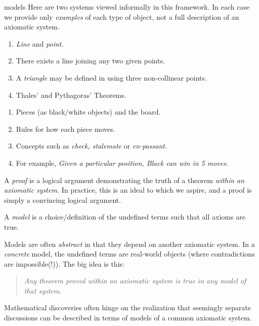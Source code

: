 \begin{examples}{}{models}
Here are two systems viewed informally in this framework. In each case we provide only \emph{examples} of each type of object, not a full description of an axiomatic system.\vspace{-5pt}
\begin{description}\itemsep0pt
	\item[\normalfont\emph{Basic Geometry}]\begin{enumerate}\itemsep2pt
	  \item \emph{Line} and \emph{point.}
	  \item There exists a line joining any two given points.
	  \item A \emph{triangle} may be defined in using three non-collinear points. 
	  \item Thales' and Pythagoras' Theorems.
  \end{enumerate}
	\item[\normalfont\emph{Chess}]\begin{enumerate}\itemsep2pt
	  \item Pieces (as black/white objects) and the board.
	  \item Rules for how each piece moves.
	  \item Concepts such as \emph{check, stalemate} or \emph{en-passant.}
	  \item For example, \emph{Given a particular position, Black can win in 5 moves.}
  \end{enumerate}	
\end{description}
\end{examples}


A \emph{proof} is a logical argument demonstrating the truth of a theorem \emph{within an axiomatic system.} In practice, this is an ideal to which we aspire, and a proof is simply a convincing logical argument.



\begin{defn}{}{}
A \emph{model} is a choice/definition of the undefined terms such that all axioms are true.
\end{defn}

Models are often \emph{abstract} in that they depend on another axiomatic system. In a \emph{concrete} model, the undefined terms are real-world objects (where contradictions are impossible(!)). The big idea is this:
\begin{quote}
\emph{Any theorem proved within an axiomatic system is true in any model of that system.}
\end{quote}
Mathematical discoveries often hinge on the realization that seemingly separate discussions can be described in terms of models of a common axiomatic system.

